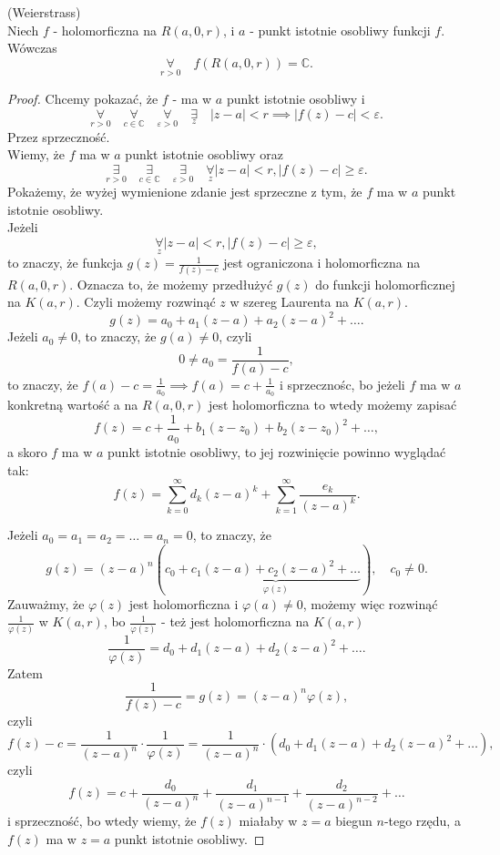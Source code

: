\documentclass[../main.tex]{subfiles}
\begin{document}
\begin{tw}
    (Weierstrass)\\
    Niech $f$ - holomorficzna na $R(a,0,r)$, i $a$ - punkt istotnie osobliwy funkcji $f$. Wówczas
    \[
        \underset{r>0}{\forall} \quad f(R(a,0,r)) = \mathbb{C}
    .\]
\end{tw}
\begin{proof}
    Chcemy pokazać, że $f$ - ma w $a$ punkt istotnie osobliwy i
    \[
        \underset{r > 0}{\forall} \quad \underset{c\in \mathbb{C}}{\forall} \quad \underset{\varepsilon > 0}{\forall} \quad \underset{z}{\exists} \quad \left| z-a \right| < r \implies \left| f(z) - c \right| < \varepsilon
    .\]
Przez sprzeczność.\\
Wiemy, że $f$ ma w $a$ punkt istotnie osobliwy oraz
\[
    \underset{r > 0}{\exists} \quad \underset{c\in\mathbb{C}}{\exists} \quad \underset{\varepsilon > 0}{\exists} \quad \underset{z}{\forall} \left| z-a \right| < r , \left| f(z) - c \right| \ge \varepsilon
.\]
Pokażemy, że wyżej wymienione zdanie jest sprzeczne z tym, że $f$ ma w $a$ punkt istotnie osobliwy.\\
Jeżeli
\[
    \underset{z}{\forall} \left| z - a \right| < r, \left| f(z) - c \right| \ge \varepsilon
,\]
to znaczy, że funkcja $g(z) = \frac{1}{f(z) - c}$ jest ograniczona i holomorficzna na $R(a,0,r)$. Oznacza to, że możemy przedłużyć $g(z)$ do funkcji holomorficznej na $K(a,r)$. Czyli możemy rozwinąć $z$ w szereg Laurenta na $K(a,r)$.
\[
    g(z) = a_0 + a_1(z-a) + a_2(z-a)^2 + \ldots
.\]
    Jeżeli $a_0 \neq 0$, to znaczy, że $g(a) \neq 0$, czyli
         \[
             0 \neq a_0 = \frac{1}{f(a) - c}
        ,\]
    to znaczy, że $f(a) - c = \frac{1}{a_0} \implies f(a) = c+ \frac{1}{a_0}$ i sprzecznośc, bo jeżeli $f$ ma w $a$ konkretną wartość a na $R(a,0,r)$ jest holomorficzna to wtedy możemy zapisać
        \[
            f(z) = c + \frac{1}{a_0} + b_1(z-z_0) + b_2(z-z_0)^2 + \ldots
        ,\]
    a skoro $f$ ma w $a$ punkt istotnie osobliwy, to jej rozwinięcie powinno wyglądać tak:
        \[
            f(z) = \sum_{k = 0}^{\infty} d_k(z-a)^k + \sum_{k = 1}^{\infty} \frac{e_k}{(z-a)^k}
        .\]
\item Jeżeli $a_0 = a_1 = a_2 = \ldots = a_n =  0$, to znaczy, że
        \[
            g(z) = (z-a)^n\left( c_0 + \underbrace{c_1(z-a) + c_2(z-a)^2 + \ldots }_{\varphi(z)}\right),\quad c_0 \neq 0
        .\]
    Zauważmy, że $\varphi(z)$ jest holomorficzna i $\varphi(a) \neq 0$, możemy więc rozwinąć $\frac{1}{\varphi(z)}$ w $K(a,r)$, bo $\frac{1}{\varphi(z)}$ - też jest holomorficzna na $K(a,r)$
        \[
            \frac{1}{\varphi(z)} = d_0 + d_1(z-a) + d_2(z-a)^2 + \ldots
        .\]
    Zatem
        \[
            \frac{1}{f(z) - c} = g(z) = (z-a)^n\varphi(z)
        ,\]
    czyli
        \[
            f(z) - c = \frac{1}{(z-a)^n}\cdot \frac{1}{\varphi(z)} = \frac{1}{(z-a)^n}\cdot \left( d_0 + d_1(z-a) + d_2(z-a)^2 + \ldots \right)
        ,\]
    czyli
        \[
            f(z) = c + \frac{d_0}{(z-a)^n} + \frac{d_1}{(z-a)^{n-1}} + \frac{d_2}{(z-a)^{n-2}} + \ldots
        \]
        i sprzeczność, bo wtedy wiemy, że $f(z)$ miałaby w $z = a$ biegun $n$-tego rzędu, a $f(z)$ ma w $z = a$ punkt istotnie osobliwy.
\end{proof}
\end{document}
